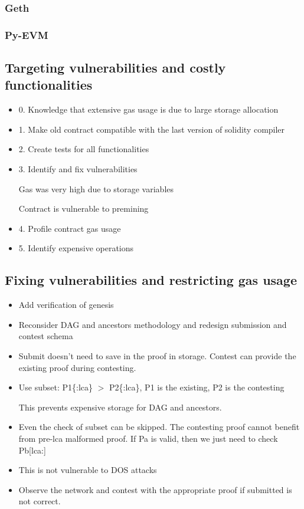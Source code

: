 \documentclass{article}
\begin{document}
  \subsubsection{Geth}

  \subsubsection{Py-EVM}

  \subsection{Targeting vulnerabilities and costly functionalities}

  \begin{itemize}
  \item
    0. Knowledge that extensive gas usage is due to large storage
    allocation
  \item
    1. Make old contract compatible with the last version of solidity
    compiler
  \item
    2. Create tests for all functionalities
  \item
    3. Identify and fix vulnerabilities

    Gas was very high due to storage variables

    Contract is vulnerable to premining
  \item
    4. Profile contract gas usage
  \item
    5. Identify expensive operations
  \end{itemize}

  \subsection{Fixing vulnerabilities and restricting gas usage}

  \begin{itemize}

  \item
    Add verification of genesis
  \item
    Reconsider DAG and ancestors methodology and redesign submission and
    contest schema
  \item
    Submit doesn't need to save in the proof in storage. Contest can
    provide the existing proof during contesting.

  \item
    Use subset: P1\{:lca\} $>$ P2\{:lca\}, P1 is the existing, P2 is the
    contesting

    This prevents expensive storage for DAG and ancestors.

  \item
    Even the check of subset can be skipped. The contesting proof cannot
    benefit from pre-lca malformed proof. If Pa is valid, then we just
    need to check Pb[lca:]

  \item
    This is not vulnerable to DOS attacks

  \item
    Observe the network and contest with the appropriate proof if
    submitted is not correct.

  \end{itemize}
\end{document}
